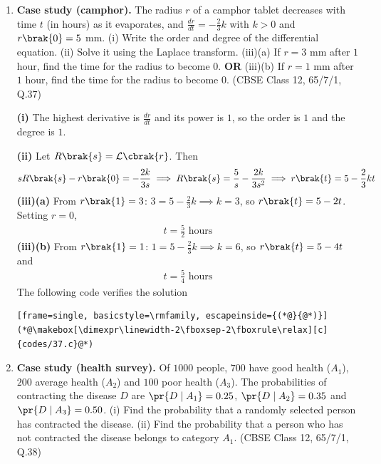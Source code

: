 \begin{enumerate}[label=\thesubsection.\arabic*, ref=\thesubsection.\theenumi]
\item
\textbf{Case study (camphor).} The radius $r$ of a camphor tablet decreases with time $t$ (in hours) as it evaporates, and $\frac{dr}{dt} = -\frac{2}{3}k$ with $k > 0$ and $r\brak{0} = 5$ mm. (i) Write the order and degree of the differential equation. (ii) Solve it using the Laplace transform. (iii)(a) If $r = 3$ mm after $1$ hour, find the time for the radius to become $0$. \textbf{OR} (iii)(b) If $r = 1$ mm after $1$ hour, find the time for the radius to become $0$.
\hfill (CBSE Class 12, 65/7/1, Q.37)

\solution
\textbf{(i)} The highest derivative is $\frac{dr}{dt}$ and its power is $1$, so the order is $1$ and the degree is $1$.

\textbf{(ii)} Let $R\brak{s} = \mathcal{L}\cbrak{r}$. Then
\begin{align}
	sR\brak{s} - r\brak{0} = -\frac{2k}{3s} \implies R\brak{s} = \frac{5}{s} - \frac{2k}{3s^2}
	\implies r\brak{t} = 5 - \frac{2}{3}kt
\end{align}
\textbf{(iii)(a)} From $r\brak{1} = 3$: $3 = 5 - \frac{2}{3}k \implies k = 3$, so $r\brak{t} = 5 - 2t$. Setting $r = 0$,
\begin{align}
	t = \frac{5}{2} \text{ hours}
\end{align}
\textbf{(iii)(b)} From $r\brak{1} = 1$: $1 = 5 - \frac{2}{3}k \implies k = 6$, so $r\brak{t} = 5 - 4t$ and
\begin{align}
	t = \frac{5}{4} \text{ hours}
\end{align}
The following code verifies the solution
\begin{lstlisting}[frame=single, basicstyle=\rmfamily, escapeinside={(*@}{@*)}]
(*@\makebox[\dimexpr\linewidth-2\fboxsep-2\fboxrule\relax][c]{codes/37.c}@*)
\end{lstlisting}

\item
\textbf{Case study (health survey).} Of $1000$ people, $700$ have good health ($A_1$), $200$ average health ($A_2$) and $100$ poor health ($A_3$). The probabilities of contracting the disease $D$ are $\pr{D\mid A_1} = 0.25$, $\pr{D\mid A_2} = 0.35$ and $\pr{D\mid A_3} = 0.50$. (i) Find the probability that a randomly selected person has contracted the disease. (ii) Find the probability that a person who has not contracted the disease belongs to category $A_1$.
\hfill (CBSE Class 12, 65/7/1, Q.38)


\end{enumerate}
